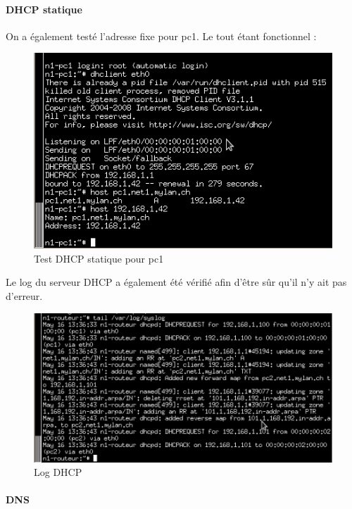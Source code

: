 \documentclass{article}
\begin{document}
\paragraph{DHCP statique}

On a également testé l'adresse fixe pour pc1. Le tout étant fonctionnel :

\begin{figure}[!h]
	\centering
	\includegraphics{./captures/7-testfixadress.png}
	\caption{Test DHCP statique pour pc1}
	\label{fig:Test DHCP statique pour pc1}
\end{figure}

\clearpage

Le log du serveur DHCP a également été vérifié afin d'être sûr qu'il n'y ait pas d'erreur.

\begin{figure}[!h]
	\centering
	\includegraphics{./captures/2-log-dhcp.png}
	\caption{Log DHCP}
	\label{fig:Log DHCP}
\end{figure}

\paragraph{DNS}
\end{document}
